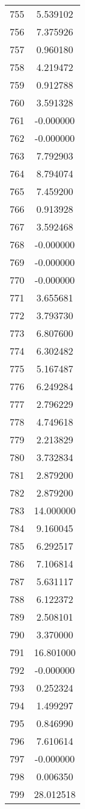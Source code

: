 \documentclass[12pt]{article}
\begin{document}
\begin{longtable}{@{}cc@{}}
755 & 5.539102 \\
756 & 7.375926 \\
757 & 0.960180 \\
758 & 4.219472 \\
759 & 0.912788 \\
760 & 3.591328 \\
761 & -0.000000 \\
762 & -0.000000 \\
763 & 7.792903 \\
764 & 8.794074 \\
765 & 7.459200 \\
766 & 0.913928 \\
767 & 3.592468 \\
768 & -0.000000 \\
769 & -0.000000 \\
770 & -0.000000 \\
771 & 3.655681 \\
772 & 3.793730 \\
773 & 6.807600 \\
774 & 6.302482 \\
775 & 5.167487 \\
776 & 6.249284 \\
777 & 2.796229 \\
778 & 4.749618 \\
779 & 2.213829 \\
780 & 3.732834 \\
781 & 2.879200 \\
782 & 2.879200 \\
783 & 14.000000 \\
784 & 9.160045 \\
785 & 6.292517 \\
786 & 7.106814 \\
787 & 5.631117 \\
788 & 6.122372 \\
789 & 2.508101 \\
790 & 3.370000 \\
791 & 16.801000 \\
792 & -0.000000 \\
793 & 0.252324 \\
794 & 1.499297 \\
795 & 0.846990 \\
796 & 7.610614 \\
797 & -0.000000 \\
798 & 0.006350 \\
799 & 28.012518 \\

\end{longtable}
\end{document}

